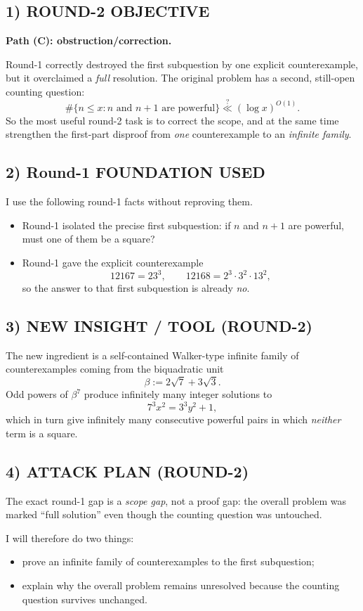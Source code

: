 \subsection*{1) ROUND-2 OBJECTIVE}
\textbf{Path (C): obstruction/correction.}

Round-1 correctly destroyed the first subquestion by one explicit counterexample, but it overclaimed a \emph{full} resolution. The original problem has a second, still-open counting question:
\[
\#\{n\le x : n\mbox{ and }n+1\mbox{ are powerful}\} \stackrel{?}{\ll} (\log x)^{O(1)}.
\]
So the most useful round-2 task is to correct the scope, and at the same time strengthen the first-part disproof from \emph{one} counterexample to an \emph{infinite family}.

\subsection*{2) Round-1 FOUNDATION USED}
I use the following round-1 facts without reproving them.
\begin{itemize}
\item Round-1 isolated the precise first subquestion: if $n$ and $n+1$ are powerful, must one of them be a square?
\item Round-1 gave the explicit counterexample
\[
12167=23^3,\qquad 12168=2^3\cdot 3^2\cdot 13^2,
\]
so the answer to that first subquestion is already \emph{no}.
\end{itemize}

\subsection*{3) NEW INSIGHT / TOOL (ROUND-2)}
The new ingredient is a self-contained Walker-type infinite family of counterexamples coming from the biquadratic unit
\[
\beta:=2\sqrt{7}+3\sqrt{3}.
\]
Odd powers of $\beta^7$ produce infinitely many integer solutions to
\[
7^3x^2=3^3y^2+1,
\]
which in turn give infinitely many consecutive powerful pairs in which \emph{neither} term is a square.

\subsection*{4) ATTACK PLAN (ROUND-2)}
The exact round-1 gap is a \emph{scope gap}, not a proof gap: the overall problem was marked ``full solution'' even though the counting question was untouched.

I will therefore do two things:
\begin{itemize}
\item prove an infinite family of counterexamples to the first subquestion;
\item explain why the overall problem remains unresolved because the counting question survives unchanged.
\end{itemize}

